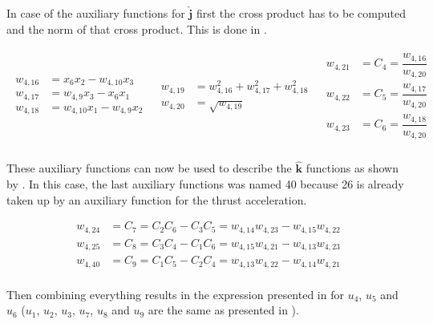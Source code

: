 \noindent
In case of the auxiliary functions for $\mathbf{\hat{j}}$ first the cross product has to be computed and the norm of that cross product. This is done in .

\begin{align} \label{eq:jHatAuxF}
\begin{split}
w_{4,16} &= x_{6}x_{2}-w_{4,10}x_{3}\\
w_{4,17} &= w_{4,9}x_{3}-x_{6}x_{1}\\
w_{4,18} &= w_{4,10}x_{1}-w_{4,9}x_{2} \\
\end{split}
&
\begin{split}
w_{4,19} &= w_{4,16}^{2}+w_{4,17}^{2}+w_{4,18}^{2} \\
w_{4,20} &= \sqrt{w_{4,19}} \\
\end{split}
&
\begin{split}
w_{4,21} &= C_{4} = \dfrac{w_{4,16}}{w_{4,20}} \\
w_{4,22} &= C_{5} = \dfrac{w_{4,17}}{w_{4,20}} \\
w_{4,23} &= C_{6} = \dfrac{w_{4,18}}{w_{4,20}} \\
\end{split}
\end{align}

\noindent
These auxiliary functions can now be used to describe the $\mathbf{\hat{k}}$ functions as shown by . In this case, the last auxiliary functions was named 40 because 26 is already taken up by an auxiliary function for the thrust acceleration.

\begin{equation} \label{eq:kHatAuxF}
\begin{split}
w_{4,24} &= C_{7} = C_{2}C_{6}-C_{3}C_{5} = w_{4,14}w_{4,23}-w_{4,15}w_{4,22} \\
w_{4,25} &= C_{8} = C_{3}C_{4}-C_{1}C_{6} = w_{4,15}w_{4,21}-w_{4,13}w_{4,23}\\
w_{4,40} &= C_{9} = C_{1}C_{5}-C_{2}C_{4} = w_{4,13}w_{4,22}-w_{4,14}w_{4,21}\\
\end{split}
\end{equation}

\noindent
Then combining everything results in the expression presented in  for $u_{4}$, $u_{5}$ and $u_{6}$ ($u_{1}$, $u_{2}$, $u_{3}$, $u_{7}$, $u_{8}$ and $u_{9}$ are the same as presented in ). 

